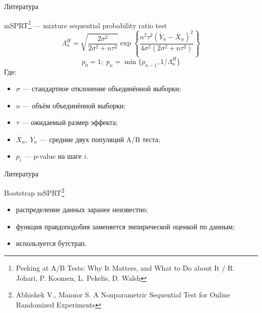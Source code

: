\documentclass[12pt, unicode]{beamer}
\newif\ifmetropolis
\begin{document}
	\begin{frame}[fragile]{Литература}
		\begin{block}{mSPRT\footnote[1]{
			Peeking at A/B Tests: Why It Matters, and What to Do about It / R. Johari, P.
			Koomen, L. Pekelis, D. Walsh	
		} --- mixture sequential probability ratio test}
			\begin{equation}
				\label{eqn:mSPRT}
				\Lambda_{n}^{H} = \sqrt{\frac{2\sigma^2}{2\sigma^2 +n\tau^2}} \exp\left\{\frac{n^2\tau^2 (\overline{Y}_n-\overline{X}_n)^2}{4\sigma^2(2\sigma^2+n\tau^2)}\right\}
			\end{equation}
			\begin{equation}
				p_0=1;\;p_n=\min\{p_{n-1},1/\Lambda_{n}^{H}\}
			\end{equation}
			Где:
			\vspace*{-0.5cm}
			\begin{itemize}
				\item $\sigma$ --- стандартное отклонение объединённой выборки;
				\item $n$ --- объём объединённой выборки;
				\item $\tau$ --- ожидаемый размер эффекта;
				\item $\overline{X}_n,\ \overline{Y}_n$ --- средние двух популяций A/B теста;
				\item $p_i$ --- p-value на шаге $i$.
			\end{itemize}
			\vspace*{-0.5cm}
		\end{block}
		\vfill\null
	\end{frame}
	

	\begin{frame}[fragile]{Литература}
		\begin{block}{Bootstrap mSPRT\footnote[2]{
					Abhishek V., Mannor S. A Nonparametric Sequential Test for Online Randomized
Experiments
			}}
			\ifmetropolis
				\smallskip
			\fi
			\begin{itemize}
				\item распределение данных заранее неизвестно;
				\item функция правдоподобия заменяется эмпирической оценкой по данным;
				\item используется бутстрап.
			\end{itemize}
		\end{block}
		\vfill\null
	\end{frame}
\end{document}
